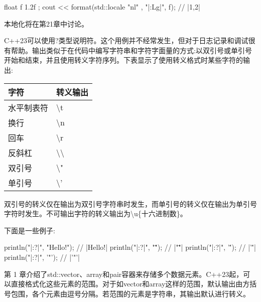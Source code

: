 \begin{cpp}
float f { 1.2f };
cout << format(std::locale{ "nl" }, "|{:Lg}|\n", f); // |1,2|
\end{cpp}

本地化将在第21章中讨论。



C++23可以使用?类型说明符。这个用例并不经常发生，但对于日志记录和调试很有帮助。输出类似于在代码中编写字符串和字符字面量的方式:以双引号或单引号开始和结束，并且使用转义字符序列。下表显示了使用转义格式时某些字符的输出:

\begin{longtable}{|l|l|}
\hline
字符       & 转义输出                   \\ \hline
\endfirsthead
%
\endhead
%
水平制表符  & \textbackslash{}t                \\ \hline
换行        & \textbackslash{}n                \\ \hline
回车 & \textbackslash{}r                \\ \hline
反斜杠       & \textbackslash{}\textbackslash{} \\ \hline
双引号    & \textbackslash{}"                \\ \hline
单引号    & \textbackslash{}'                \\ \hline
\end{longtable}

双引号的转义仅在输出为双引号字符串时发生，而单引号的转义仅在输出为单引号字符时发生。不可输出字符的转义输出为\textbackslash{}u\{十六进制数\}。

下面是一些例子:

\begin{cpp}
println("|{:?}|", "Hello\tWorld!\n");   // |Hello\tWorld!\n|
println("|{:?}|", "\"");                // |"\""|
println("|{:?}|", '\'');                // |'\''|
println("|{:?}|", '"');                 // |'"'|
\end{cpp}



第 1 章介绍了std::vector、array和pair容器来存储多个数据元素。C++23起，可以直接格式化这些元素的范围。对于如vector和array这样的范围，默认输出由方括号包围，各个元素由逗号分隔。若范围的元素是字符串，其输出默认进行转义。

